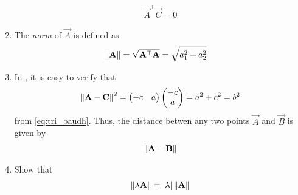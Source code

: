 \begin{enumerate}[label=\thesection.\arabic*.,ref=\thesection.\theenumi]
\begin{align}
  \vec{A}^{\top} \vec{C}  = 0
\end{align}
\item The {\em norm} of $\vec{A}$ is defined as
\begin{align}
  \label{eq:norm2d}
	\norm{\vec{A}} 
  &= \sqrt{\vec{A}^{\top} \vec{A}}= \sqrt{a_1^2+a_2^2}
\end{align}
\item In 
,	
it is easy to verify that 
\begin{align}
\left\lVert\mathbf{A}-\mathbf{C}\right\rVert^2  
  = \begin{pmatrix}-c & a\end{pmatrix} \begin{pmatrix}-c \\ a\end{pmatrix}
= a^2 + c^2 = b^2
\end{align}
from 
	\eqref{eq:tri_baudh}.
Thus, 
	the distance betwen any two  points $\vec{A}$ and $\vec{B}$ is given by 
\begin{align}
  \label{eq:norm2d_dist}
\norm{\vec{A}-\vec{B}} 
\end{align}
\item Show that 
\begin{align}
  \label{eq:norm2d_const}
  \norm{\lambda \vec{A}} 
  = \abs{\lambda} \norm{\vec{A}}
\end{align}
\end{enumerate}
